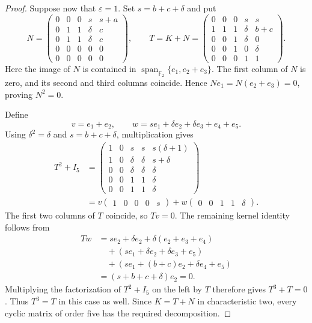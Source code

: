 \documentclass[12pt]{amsart}
\theoremstyle{remark}
\numberwithin{equation}{section}
\theoremstyle{definition}
\newcommand{\F}{\mathbb F}
\newcommand{\Id}{I}
\begin{document}
\begin{proof}
Suppose now that $\varepsilon=1$. Set $s=b+c+\delta$ and put
\[
 N=\begin{pmatrix}
 0&0&0&s&s+a\\
 0&1&1&\delta&c\\
 0&1&1&\delta&c\\
 0&0&0&0&0\\
 0&0&0&0&0
 \end{pmatrix},
 \qquad
 T=K+N=\begin{pmatrix}
 0&0&0&s&s\\
 1&1&1&\delta&b+c\\
 0&0&1&\delta&0\\
 0&0&1&0&\delta\\
 0&0&0&1&1
 \end{pmatrix}.
\]
Here the image of $N$ is contained in $\operatorname{span}_{\F_2}\{e_1,e_2+e_3\}$. The first column of $N$ is zero, and its second and third columns coincide. Hence $Ne_1=N(e_2+e_3)=0$, proving $N^2=0$.

Define
\[
 v=e_1+e_2,
 \qquad
 w=se_1+\delta e_2+\delta e_3+e_4+e_5.
\]
Using $\delta^2=\delta$ and $s=b+c+\delta$, multiplication gives
\[
\begin{aligned}
 T^2+\Id_5&=
 \begin{pmatrix}
 1&0&s&s&s(\delta+1)\\
 1&0&\delta&\delta&s+\delta\\
 0&0&\delta&\delta&\delta\\
 0&0&1&1&\delta\\
 0&0&1&1&\delta
 \end{pmatrix}\\
 &=v\begin{pmatrix}1&0&0&0&s\end{pmatrix}
  +w\begin{pmatrix}0&0&1&1&\delta\end{pmatrix}.
\end{aligned}
\]
The first two columns of $T$ coincide, so $Tv=0$. The remaining kernel identity follows from
\begin{align*}
 Tw&=s e_2+\delta e_2+\delta(e_2+e_3+e_4)\\
 &\quad +(s e_1+\delta e_2+\delta e_3+e_5)\\
 &\quad +(s e_1+(b+c)e_2+\delta e_4+e_5)\\
 &=(s+b+c+\delta)e_2=0.
\end{align*}
Multiplying the factorization of $T^2+\Id_5$ on the left by $T$ therefore gives $T^3+T=0$. Thus $T^3=T$ in this case as well. Since $K=T+N$ in characteristic two, every cyclic matrix of order five has the required decomposition.


\end{proof}
\end{document}
